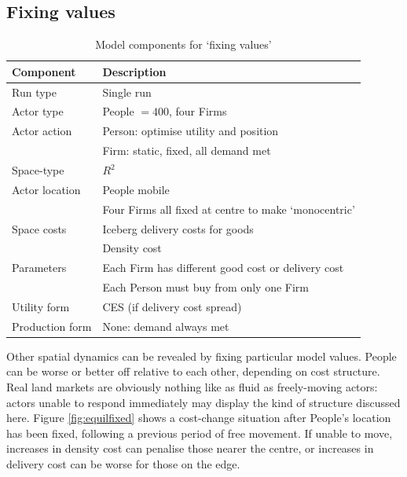 \subsection{Fixing values \label{sec:fixing}}

%
\renewcommand{\arraystretch}{1.2}
\begin{table}[!hbt]
\begin{center}

\begin{tabular}{|l|l|}
\hline 
\textbf{Component} & \textbf{Description}\\
\hline
Run type & Single run \\
\hline
Actor type & People $ = 400$, four Firms \\
\hline
Actor action & Person: optimise utility and position\\
& Firm: static, fixed, all demand met\\
\hline
Space-type & $R^2$\\
\hline
Actor location & People mobile\\
& Four Firms all fixed at centre to make `monocentric’\\ 
\hline
Space costs & Iceberg delivery costs for goods \\
& Density cost\\
\hline
Parameters & Each Firm has different good cost or delivery cost\\
& Each Person must buy from only one Firm\\
\hline
Utility form & CES (if delivery cost spread)\\
\hline
Production form & None: demand always met\\
\hline

\end{tabular}

\caption{Model components for `fixing values’ \label{tab:fixingvalues}}
\end{center}
\end{table}

Other spatial dynamics can be revealed by fixing particular model values. People can be worse or better off relative to each other, depending on cost structure. Real land markets are obviously nothing like as fluid as freely-moving actors: actors unable to respond immediately may display the kind of structure discussed here. Figure \ref{fig:equilfixed} shows a cost-change situation after People’s location has been fixed, following a previous period of free movement. If unable to move, increases in density cost can penalise those nearer the centre, or increases in delivery cost can be worse for those on the edge.

